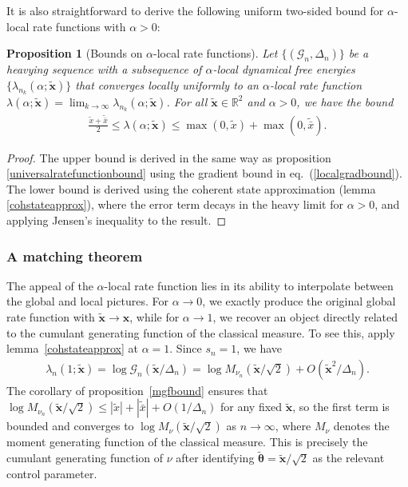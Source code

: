 \documentclass[a4paper,11pt]{article}
\theoremstyle{plain}
\newtheorem{prop}[thm]{Proposition}
\theoremstyle{definition}
\theoremstyle{remark}
\newcommand{\bs}[1]{\boldsymbol{#1}}
\newcommand{\ba}{\begin{equation} \begin{aligned}}
\newcommand{\ea}{\end{aligned} \end{equation}}
\newcommand{\De}{\Delta}
\begin{document}
It is also straightforward to derive the following uniform two-sided bound for $\alpha$-local rate functions with $\alpha>0$:

\begin{prop}[Bounds on $\alpha$-local rate functions]
\label{universalboundonlocalratefunc}
Let $\{(\mathcal{G}_n,\De_n)\}$ be a heavying sequence with a subsequence of $\alpha$-local dynamical free energies $\{\lambda_{n_k}(\alpha;\tilde{\bs{x}})\}$ that converges locally uniformly to an $\alpha$-local rate function $\lambda(\alpha;\tilde{\bs{x}}) = \lim_{k\to\infty} \lambda_{n_k}(\alpha;\tilde{\bs{x}})$. For all $\tilde{\bs{x}} \in \mathbb{R}^2$ and $\alpha>0$, we have the bound
\ba
\frac{\tilde{x} + \tilde{\bar{x}}}{2} \leq \lambda(\alpha;\tilde{\bs{x}}) \leq \max(0,\tilde{x})+\max(0,\tilde{\bar{x}}).
\ea
\end{prop}

\begin{proof}
    The upper bound is derived in the same way as proposition \ref{universalratefunctionbound} using the gradient bound in eq.~(\ref{localgradbound}). The lower bound is derived using the coherent state approximation (lemma \ref{cohstateapprox}), where the error term decays in the heavy limit for $\alpha>0$, and applying Jensen's inequality to the result.
\end{proof}

\subsubsection{A matching theorem}

The appeal of the $\alpha$-local rate function lies in its ability to interpolate between the global and local pictures. For $\alpha \to 0$, we exactly produce the original global rate function with $\tilde{\bs{x}} \to \bs{x}$, while for $\alpha \to 1$, we recover an object directly related to the cumulant generating function of the classical measure. To see this, apply lemma~\ref{cohstateapprox} at $\alpha = 1$. Since $s_n = 1$, we have
\ba
\lambda_n(1;\tilde{\bs{x}}) = \log\mathcal{G}_n(\tilde{\bs{x}}/\De_n) = \log M_{\nu_n}(\tilde{\bs{x}}/\sqrt{2}) + O(\tilde{\bs{x}}^2/\De_n).
\ea
The corollary of proposition~\ref{mgfbound} ensures that $\log M_{\nu_n}(\tilde{\bs{x}}/\sqrt{2}) \leq |\tilde{x}| + |\tilde{\bar{x}}| + O(1/\De_n)$ for any fixed $\tilde{\bs{x}}$, so the first term is bounded and converges to $\log M_\nu(\tilde{\bs{x}}/\sqrt{2})$ as $n\to\infty$, where $M_\nu$ denotes the moment generating function of the classical measure. This is precisely the cumulant generating function of $\nu$ after identifying $\tilde{\bs{\theta}} = \tilde{\bs{x}}/\sqrt{2}$ as the relevant control parameter. 
\end{document}
